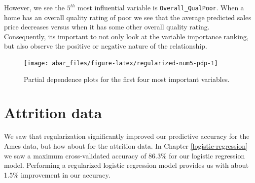 \documentclass[]{book}
\theoremstyle{definition}
\theoremstyle{definition}
\theoremstyle{definition}
\theoremstyle{remark}
\begin{document}
However, we see the \(5^{th}\) most influential variable is
\texttt{Overall\_QualPoor}. When a home has an overall quality rating of
poor we see that the average predicted sales price decreases versus when
it has some other overall quality rating. Consequently, its important to
not only look at the variable importance ranking, but also observe the
positive or negative nature of the relationship.

\begin{figure}

{\centering \texttt{[image: abar\_files/figure-latex/regularized-num5-pdp-1]} 

}

\caption{Partial dependence plots for the first four most important variables.}\label{fig:regularized-num5-pdp}
\end{figure}

\hypertarget{attrition-data}{%
\section{Attrition data}\label{attrition-data}}

We saw that regularization significantly improved our predictive
accuracy for the Ames data, but how about for the attrition data. In
Chapter \ref{logistic-regression} we saw a maximum cross-validated
accuracy of 86.3\% for our logistic regression model. Performing a
regularized logistic regression model provides us with about 1.5\%
improvement in our accuracy.
\end{document}
